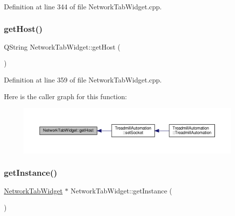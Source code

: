 Definition at line 344 of file Network\+Tab\+Widget.\+cpp.

\mbox{\label{class_network_tab_widget_afa716a54017a9cde31278525107da66e}} 
\subsubsection{\texorpdfstring{get\+Host()}{getHost()}}
{\footnotesize\ttfamily Q\+String Network\+Tab\+Widget\+::get\+Host (\begin{DoxyParamCaption}{ }\end{DoxyParamCaption})}



Definition at line 359 of file Network\+Tab\+Widget.\+cpp.

Here is the caller graph for this function\+:
\nopagebreak
\begin{figure}[H]
\begin{center}
\leavevmode
\includegraphics[width=350pt]{class_network_tab_widget_afa716a54017a9cde31278525107da66e_icgraph}
\end{center}
\end{figure}
\mbox{\label{class_network_tab_widget_a350dbedf09f3c1fb5bbcba75cc282eb8}} 
\subsubsection{\texorpdfstring{get\+Instance()}{getInstance()}}
{\footnotesize\ttfamily \hyperlink{class_network_tab_widget}{Network\+Tab\+Widget} $\ast$ Network\+Tab\+Widget\+::get\+Instance (\begin{DoxyParamCaption}{ }\end{DoxyParamCaption})\hspace{0.3cm}{\ttfamily [static]}}



